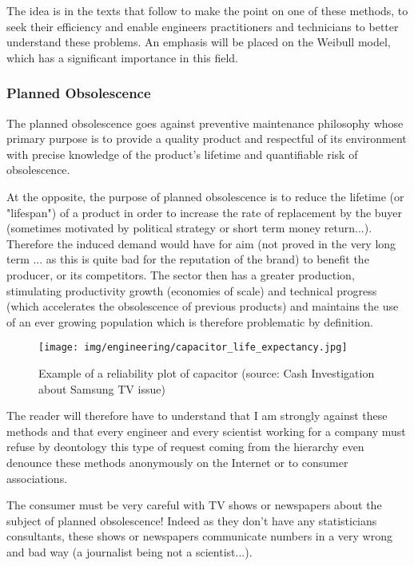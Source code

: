 	The idea is in the texts that follow to make the point on one of these methods, to seek their efficiency and enable engineers practitioners and technicians to better understand these problems. An emphasis will be placed on the Weibull model, which has a significant importance in this field.
		
	\subsubsection{Planned Obsolescence}
	The planned obsolescence goes against preventive maintenance philosophy whose primary purpose is to provide a quality product and respectful of its environment with precise knowledge of the product's lifetime and quantifiable risk of obsolescence.
		
	At the opposite, the purpose of planned obsolescence is to reduce the lifetime (or "lifespan") of a product in order to increase the rate of replacement by the buyer (sometimes motivated by political strategy or short term  money return...). Therefore the induced demand would have for aim (not proved in the very long term ... as this is quite bad for the reputation of the brand) to benefit the producer, or its competitors. The sector then has a greater production, stimulating productivity growth (economies of scale) and technical progress (which accelerates the obsolescence of previous products) and maintains the use of an ever growing population which is therefore problematic by definition.
	\begin{figure}[H]
		\centering
		\texttt{[image: img/engineering/capacitor\_life\_expectancy.jpg]}
		\caption[Example of a reliability plot of capacitor]{Example of a reliability plot of capacitor (source: Cash Investigation about Samsung TV issue) }
	\end{figure}
	The reader will therefore have to understand that I am strongly against these methods and that every engineer and every scientist working for a company must refuse by deontology this type of request coming from the hierarchy even denounce these methods anonymously on the Internet or to consumer associations.
	\begin{tcolorbox}[title=Remark,colframe=black,arc=10pt]
	The consumer must be very careful with TV shows or newspapers about the subject of planned obsolescence! Indeed as they don't have any statisticians consultants, these shows or newspapers communicate numbers in a very wrong and bad way (a journalist being not a scientist...).
	\end{tcolorbox}
		

